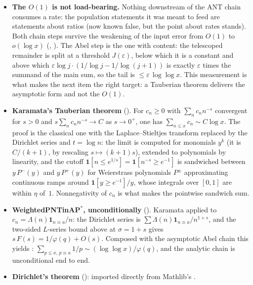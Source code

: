 \begin{itemize}
\item \textbf{The $O(1)$ is not load-bearing.}
  Nothing downstream of the ANT chain consumes a rate: the population
  statements it was meant to feed are  statements
  about ratios (now known false, but the point about rates stands).
  Both chain steps survive the weakening of the input error from
  $O(1)$ to $o(\log x)$
  (,
  ).
  The Abel step is the one with content: the telescoped remainder is
  split at a threshold $J(\varepsilon)$, below which it is a constant
  and above which $\varepsilon\log j\cdot(1/\log j - 1/\log(j{+}1))$
  is exactly $\varepsilon$ times the summand of the main sum, so the
  tail is $\leq \varepsilon\,\log\log x$.
  This measurement is what makes the next item the right target: a
  Tauberian theorem delivers the asymptotic form and not the $O(1)$.

\item \textbf{Karamata's Tauberian theorem}
().
  For $c_n \geq 0$ with $\sum_n c_n n^{-s}$ convergent for $s > 0$
  and $s\sum_n c_n n^{-s} \to C$ as $s \to 0^{+}$, one has
  $\sum_{n \leq x} c_n \sim C\log x$.
  The proof is the classical one with the Laplace--Stieltjes transform
  replaced by the Dirichlet series and $t = \log n$: the limit is
  computed for monomials $y^k$ (it is $C/(k{+}1)$, by rescaling
  $s \mapsto (k{+}1)s$), extended to polynomials by linearity, and the
  cutoff $\mathbf 1[n \leq e^{1/s}] = \mathbf 1[n^{-s} \geq e^{-1}]$ is
  sandwiched between $y\,P^{-}(y)$ and $y\,P^{+}(y)$ for Weierstrass
  polynomials $P^{\pm}$ approximating continuous ramps around
  $\mathbf 1[y \geq e^{-1}]/y$, whose integrals over $[0,1]$ are within
  $\eta$ of~$1$.  Nonnegativity of $c_n$ is what makes the pointwise
  sandwich sum.

\item \textbf{WeightedPNTinAP$^{\ast}$, unconditionally}
().
  Karamata applied to $c_n = \Lambda(n)\mathbf 1_{n \equiv a}/n$: the
  Dirichlet series is $\sum \Lambda(n)\mathbf 1_{n\equiv a}/n^{1+s}$, and
  the two-sided $L$-series bound above at $\sigma = 1{+}s$ gives
  $s\,F(s) = 1/\varphi(q) + O(s)$.  Composed with the asymptotic Abel
  chain this yields
  :
  $\sum_{p \leq x,\, p \equiv a} 1/p \sim (\log\log x)/\varphi(q)$,
  and the analytic chain is unconditional end to end.

\item \textbf{Dirichlet's theorem}
():
imported directly from Mathlib's
.
\end{itemize}

